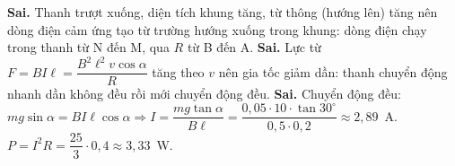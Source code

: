 \begin{ex}
{\begin{itemchoice}
				\itemch \textbf{Sai.} Thanh trượt xuống, diện tích khung tăng, từ thông (hướng lên) tăng nên dòng điện cảm ứng tạo từ trường hướng xuống trong khung: dòng điện chạy trong thanh từ N đến M, qua $R$ từ B đến A.
				\itemch \textbf{Sai.} Lực từ $F=BI\ell=\dfrac{B^2\ell^2v\cos\alpha}{R}$ tăng theo $v$ nên gia tốc giảm dần: thanh chuyển động nhanh dần không đều rồi mới chuyển động đều.
				\itemch \textbf{Sai.} Chuyển động đều: $mg\sin\alpha=BI\ell\cos\alpha\Rightarrow I=\dfrac{mg\tan\alpha}{B\ell}=\dfrac{0{,}05\cdot 10\cdot\tan 30^\circ}{0{,}5\cdot 0{,}2}\approx 2{,}89$~A.\\
				$P=I^2R=\dfrac{25}{3}\cdot 0{,}4\approx 3{,}33$~W.
			\end{itemchoice}
		}
	\end{ex}

